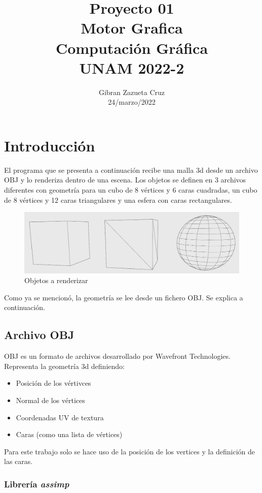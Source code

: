 \documentclass[12pt]{article}
\title{%
  Proyecto 01\\
  \large Motor Grafica \\
    \Large Computación Gráfica\\
     \large UNAM 2022-2}
\author{Gibran Zazueta Cruz \\
\small 24/marzo/2022}
\date{}
\begin{document}
\maketitle

\section{Introducción}

El programa que se presenta a continuación recibe una malla 3d desde un archivo OBJ y lo renderiza dentro de una escena. Los objetos se definen en 3 archivos diferentes con geometría para un cubo de 8 vértices y 6 caras cuadradas, un cubo de 8 vértices y 12 caras triangulares y una esfera con caras rectangulares.

\begin{figure}[H]
\centering
\includegraphics[scale=0.3]{images/objetos.png}
\caption{Objetos a renderizar}
\end{figure}


Como ya se mencionó, la geometría se lee desde un fichero OBJ. Se explica a continuación.

\subsection{Archivo OBJ}

OBJ es un formato de archivos desarrollado por Wavefront Technologies. Representa la geometría 3d definiendo:

\begin{itemize}
\item Posición de los vértivces
\item Normal de los vértices
\item Coordenadas UV de textura
\item Caras (como una lista de vértices)
\end{itemize}


Para este trabajo solo se hace uso de la posición de los vertices y la definición de las caras.


\subsubsection{Librería \textit{assimp}}
\end{document}

